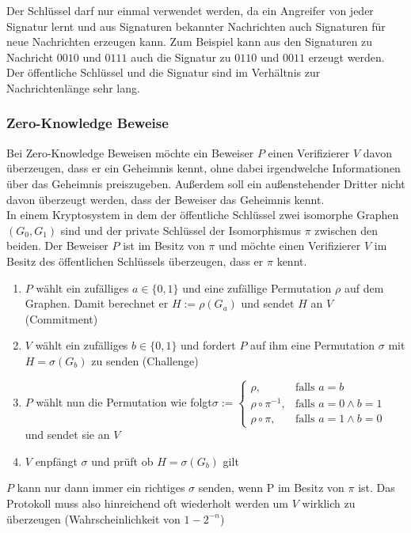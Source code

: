 \documentclass[a4paper,12pt,leqno]{article}
\begin{document}
Der Schlüssel darf nur einmal verwendet werden, da ein Angreifer von jeder Signatur lernt und aus Signaturen bekannter Nachrichten auch Signaturen für neue Nachrichten erzeugen kann. Zum Beispiel kann aus den Signaturen zu Nachricht $0010$ und $0111$ auch die Signatur zu $0110$ und $0011$ erzeugt werden.\\
Der öffentliche Schlüssel und die Signatur sind im Verhältnis zur Nachrichtenlänge sehr lang.

\subsubsection{Zero-Knowledge Beweise}

Bei Zero-Knowledge Beweisen möchte ein Beweiser $P$ einen Verifizierer $V$ davon überzeugen, dass er ein Geheimnis kennt, ohne dabei irgendwelche Informationen über das Geheimnis preiszugeben. Außerdem soll ein außenstehender Dritter nicht davon überzeugt werden, dass der Beweiser das Geheimnis kennt.\\

In einem Kryptosystem in dem der öffentliche Schlüssel zwei isomorphe Graphen $(G_0,G_1)$ sind und der private Schlüssel der Isomorphismus $\pi$ zwischen den beiden. Der Beweiser $P$ ist im Besitz von $\pi$ und möchte einen Verifizierer $V$ im Besitz des öffentlichen Schlüssels überzeugen, dass er $\pi$ kennt.

\begin{enumerate}
\item $P$ wählt ein zufälliges $a\in\{0,1\}$ und eine zufällige Permutation $\rho$ auf dem Graphen. Damit berechnet er $H:=\rho(G_a)$ und sendet $H$ an $V$ (Commitment)
\item $V$ wählt ein zufälliges $b\in\{0,1\}$ und fordert $P$ auf ihm eine Permutation $\sigma$ mit $H=\sigma(G_b)$ zu senden (Challenge)
\item $P$ wählt nun die Permutation wie folgt$\sigma:=\left\lbrace\begin{array}{lr}
\rho, & \textrm{falls }a=b\\
\rho\circ \pi^{-1},& \textrm{falls }a=0\wedge b=1\\
\rho\circ \pi, &\textrm{falls }a=1\wedge b=0
\end{array}\right.$ und sendet sie an $V$
\item $V$ enpfängt $\sigma$ und prüft ob $H=\sigma(G_b)$ gilt
\end{enumerate}
$P$ kann nur dann immer ein richtiges $\sigma$ senden, wenn P im Besitz von $\pi$ ist. Das Protokoll muss also hinreichend oft wiederholt werden um $V$ wirklich zu überzeugen (Wahrscheinlichkeit von $1-2^{-n}$)
\end{document}
